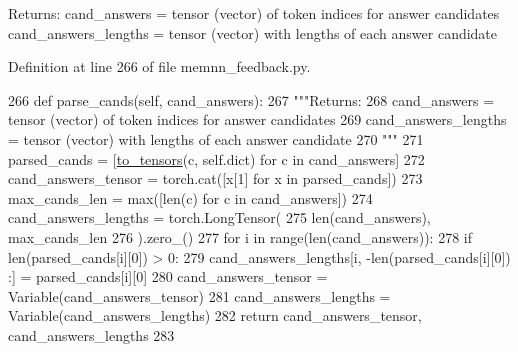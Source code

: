 \begin{DoxyVerb}Returns:
    cand_answers = tensor (vector) of token indices for answer candidates
    cand_answers_lengths = tensor (vector) with lengths of each answer candidate
\end{DoxyVerb}
 

Definition at line 266 of file memnn\+\_\+feedback.\+py.


\begin{DoxyCode}
266     \textcolor{keyword}{def }parse\_cands(self, cand\_answers):
267         \textcolor{stringliteral}{"""Returns:}
268 \textcolor{stringliteral}{            cand\_answers = tensor (vector) of token indices for answer candidates}
269 \textcolor{stringliteral}{            cand\_answers\_lengths = tensor (vector) with lengths of each answer candidate}
270 \textcolor{stringliteral}{        """}
271         parsed\_cands = [\hyperlink{namespaceparlai_1_1agents_1_1legacy__agents_1_1memnn_1_1memnn__v0_a8bf19c6993b40602c1d86a848b30c5a1}{to\_tensors}(c, self.dict) \textcolor{keywordflow}{for} c \textcolor{keywordflow}{in} cand\_answers]
272         cand\_answers\_tensor = torch.cat([x[1] \textcolor{keywordflow}{for} x \textcolor{keywordflow}{in} parsed\_cands])
273         max\_cands\_len = max([len(c) \textcolor{keywordflow}{for} c \textcolor{keywordflow}{in} cand\_answers])
274         cand\_answers\_lengths = torch.LongTensor(
275             len(cand\_answers), max\_cands\_len
276         ).zero\_()
277         \textcolor{keywordflow}{for} i \textcolor{keywordflow}{in} range(len(cand\_answers)):
278             \textcolor{keywordflow}{if} len(parsed\_cands[i][0]) > 0:
279                 cand\_answers\_lengths[i, -len(parsed\_cands[i][0]) :] = parsed\_cands[i][0]
280         cand\_answers\_tensor = Variable(cand\_answers\_tensor)
281         cand\_answers\_lengths = Variable(cand\_answers\_lengths)
282         \textcolor{keywordflow}{return} cand\_answers\_tensor, cand\_answers\_lengths
283 
\end{DoxyCode}
\mbox{\label{classprojects_1_1memnn__feedback_1_1agent_1_1memnn__feedback_1_1MemnnFeedbackAgent_a2e75fe3eda586069de1a2435ba7fae16}} 
